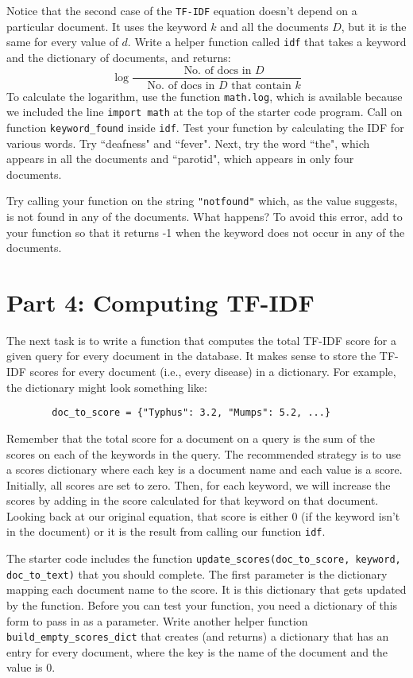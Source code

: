\documentclass{assignment}
\begin{document}
Notice that the second case of the \verb|TF-IDF| equation doesn't depend on a particular document. It uses the
keyword $k$ and all the documents $D$, but it is the same for every value of $d$. 
Write a helper function called \verb|idf| that
takes a keyword and the dictionary of documents, and returns:
\[
    \log \frac{ \quad \text{ No. of docs in } D }{ \quad \text{ No. of docs in } D \text{ that contain } k} 
\]
To calculate the logarithm, use the function \verb|math.log|, which is available because 
we included the line \verb|import math| at the top of the starter code program.
Call on function \verb|keyword_found| inside \verb|idf|. Test your function by calculating the IDF for various words. Try ``deafness" and ``fever".
Next, try the word ``the", which appears in all the documents and ``parotid", which appears in only four documents.

Try calling your function on the string \verb|"notfound"| which, as the value suggests, 
is not found in any of the documents. What happens? To avoid this error, add to your function so that it 
returns -1 when the keyword does not occur in any of the documents.

\section*{Part 4: Computing TF-IDF}
The next task is to write a function that computes the total TF-IDF score for a given query for every 
document in the database. It makes sense to store the TF-IDF scores for every document (i.e., every disease) 
in a dictionary. For example, the dictionary might look something like:
\begin{verbatim}
        doc_to_score = {"Typhus": 3.2, "Mumps": 5.2, ...}
\end{verbatim}  
Remember that the total score for a document on a query is the sum of the scores on each of the keywords in the query. The recommended strategy is to use a scores dictionary where each key is a document name and each value is a score.  Initially, all scores are set to zero. Then, for each
keyword, we will increase the scores by adding in the score calculated for that keyword on that document. Looking back at our original equation, that
score is either 0 (if the keyword isn't in the document) or it is the result from calling our function \verb|idf|.

The starter code includes the function \verb|update_scores(doc_to_score, keyword, doc_to_text)| that you should complete. The first parameter is the dictionary
mapping each document name to the score. It is this dictionary that gets updated by the function.  Before you can test your function, you need a dictionary of 
this form to pass in as a parameter. Write another helper function \verb|build_empty_scores_dict| that creates (and returns) a dictionary that has an entry for every document, where the key is the name of the document and the value is 0.
\end{document}
